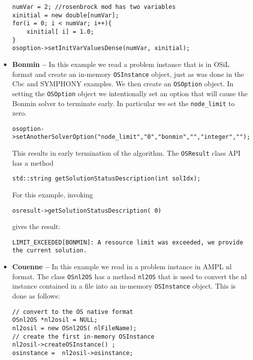 \begin{itemize}
\begin{verbatim}
numVar = 2; //rosenbrock mod has two variables 
xinitial = new double[numVar];
for(i = 0; i < numVar; i++){
    xinitial[ i] = 1.0;
}
osoption->setInitVarValuesDense(numVar, xinitial);
\end{verbatim}



\item {\bf Bonmin --}  In this example we read a problem instance that is in OSiL format and create 
an in-memory {\tt OSInstance} object, just as was done in the Cbc and SYMPHONY examples.   
We then create an {\tt OSOption} object.  In setting the  {\tt OSOption} object we intentionally 
set an option that will cause the Bonmin solver to terminate early.  In particular we set the 
{\tt node\_limit} to zero. 

\begin{verbatim}
osoption->setAnotherSolverOption("node_limit","0","bonmin","","integer","");
\end{verbatim}

This results in early termination of the algorithm. The {\tt OSResult} class API has a method
\begin{verbatim}
std::string getSolutionStatusDescription(int solIdx);
\end{verbatim}

For this example, invoking
\begin{verbatim}
osresult->getSolutionStatusDescription( 0)
\end{verbatim}
gives the result:
\begin{verbatim}
LIMIT_EXCEEDED[BONMIN]: A resource limit was exceeded, we provide the current solution.
\end{verbatim}


\item {\bf Couenne --}   In this example we read in a problem instance in AMPL nl format.  
The class {\tt OSnl2OS}  has a method {\tt nl2OS} that is used to convert the nl instance 
contained in a file into an in-memory {\tt OSInstance} object. This is done as follows:

\begin{verbatim}
// convert to the OS native format
OSnl2OS *nl2osil = NULL;
nl2osil = new OSnl2OS( nlFileName);
// create the first in-memory OSInstance
nl2osil->createOSInstance() ;
osinstance =  nl2osil->osinstance;
\end{verbatim}
\end{itemize}

